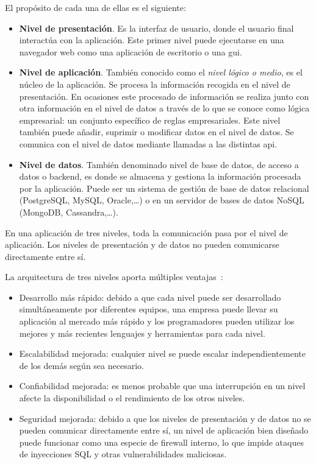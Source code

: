 El propósito de cada una de ellas es el siguiente:
\begin{itemize}
\item \textbf{Nivel de presentación}. Es la interfaz de usuario, donde el usuario final interactúa con la aplicación. Este primer nivel puede ejecutarse en una navegador web como una aplicación de escritorio o una \acrshort{gui}.
\item \textbf{Nivel de aplicación}. También conocido como el \textit{nivel lógico o medio}, es el núcleo de la aplicación. Se procesa la información recogida en el nivel de presentación. En ocasiones este procesado de información se realiza junto con otra información en el nivel de datos a través de lo que se conoce como  lógica empresarial: un conjunto específico de reglas empresariales. Este nivel también puede añadir, suprimir o modificar datos en el nivel de datos. Se comunica con el nivel de datos mediante llamadas a las distintas \acrshort{api}. 
\item \textbf{Nivel de datos}. También denominado nivel de base de datos, de acceso a datos o backend, es donde se almacena y gestiona la información procesada por la aplicación. Puede ser un sistema de gestión de base de datos relacional (PostgreSQL, MySQL, Oracle,\dots) o en un servidor de bases de datos NoSQL (MongoDB, Cassandra,\dots). \newline
\end{itemize}


En una aplicación de tres niveles, toda la comunicación pasa por el nivel de aplicación. Los niveles de presentación y de datos no pueden comunicarse directamente entre sí.

La arquitectura de tres niveles aporta múltiples ventajas~\cite{ibmMVC}:
\begin{itemize}
\item Desarrollo más rápido: debido a que cada nivel puede ser desarrollado simultáneamente por diferentes equipos, una empresa puede llevar su aplicación al mercado más rápido y los programadores pueden utilizar los mejores y más recientes lenguajes y herramientas para cada nivel.
\item Escalabilidad mejorada: cualquier nivel se puede escalar independientemente de los demás según sea necesario.
\item Confiabilidad mejorada: es menos probable que una interrupción en un nivel afecte la disponibilidad o el rendimiento de los otros niveles.
\item Seguridad mejorada: debido a que los niveles de presentación y de datos no se pueden comunicar directamente entre sí, un nivel de aplicación bien diseñado puede funcionar como una especie de firewall interno, lo que impide ataques de inyecciones SQL y otras vulnerabilidades maliciosas.
\end{itemize}


